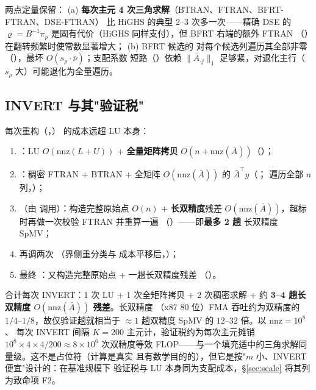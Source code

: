 \documentclass[11pt]{ctexart}
\newcommand{\nnz}{\mathrm{nnz}}
\begin{document}
两点定量保留：
(a) \textbf{每次主元 4 次三角求解}（BTRAN、FTRAN、BFRT-FTRAN、DSE-FTRAN）
比 HiGHS 的典型 2--3 次多一次——精确 DSE 的 $\varrho = B^{-1}\pi_p$
是固有代价（HiGHS 同样支付），但 BFRT 右端的额外 FTRAN
（）在翻转频繁时使常数显著增大；
(b) BFRT 候选的  对每个候选列遍历其全部非零
（），最坏 $O(s_\rho\cdot\bar\nu)$；支配系数
短路（）依赖 $\|\bar A_{\cdot j}\|_1$
足够紧，对退化主行（$s_\rho$ 大）可能退化为全量遍历。

\subsection{INVERT 与其"验证税"}
\label{sec:invert}
每次重构（，）
的成本远超 LU 本身：
\begin{enumerate}[label=(\roman*),leftmargin=2em]
\item {}：LU $O(\nnz(L{+}U))$ +
\textbf{全量矩阵拷贝} $O(n + \nnz(\bar A))$（）；
\item {}：稠密 FTRAN + BTRAN + 全矩阵 $O(\nnz(\bar A))$
的 $\bar A^{\top}y$（；
 遍历全部 $n$ 列，）；
\item {}（由
 调用）：构造完整原始点 $O(n)$ + \textbf{长双精度}残差
$O(\nnz(\bar A))$，超标时再做一次校验 FTRAN 并重算一遍
（）——即\textbf{最多 2 趟}
长双精度 SpMV；
\item {} 再调两次 （界侧重分类与
成本平移后，）；
\item 最终 ：又构造完整原始点 + 一趟长双精度残差
（）。
\end{enumerate}
合计每次 INVERT：1 次 LU + 1 次全矩阵拷贝 + 2 次稠密求解 +
约 \textbf{3--4 趟长双精度 $O(\nnz(\bar A))$ 残差}。长双精度
（x87 80 位）FMA 吞吐约为双精度的 $1/4$--$1/8$，故仅验证趟就相当于
$\approx 1$ 趟双精度 SpMV 的 $12$--$32$ 倍。以 $\nnz=10^{8}$、
每次 INVERT 间隔 $K=200$ 主元计，验证税约为每次主元摊销
$10^{8}\times 4 \times 4 / 200 \approx 8\times10^{6}$ 次双精度等效
FLOP——与一个填充适中的三角求解同量级。这不是占位符（计算是真实
且有数学目的的），但它是按"$m$ 小、INVERT 便宜"设计的：在基准规模下
验证税与 LU 本身同为支配成本，\S\ref{sec:scale} 将其列为致命项 F2。
\end{document}
